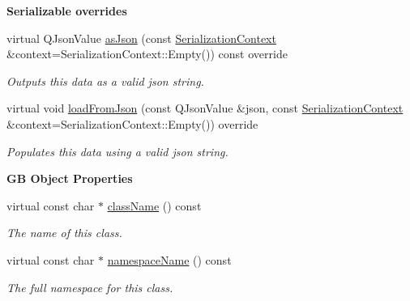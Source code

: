 \begin{Indent}\textbf{ Serializable overrides}\par
\begin{DoxyCompactItemize}
\item 
\mbox{\label{classrev_1_1_animation_state_a7ae957bef5074c327a6a705aa59ed3f7}} 
virtual Q\+Json\+Value \mbox{\hyperlink{classrev_1_1_animation_state_a7ae957bef5074c327a6a705aa59ed3f7}{as\+Json}} (const \mbox{\hyperlink{structrev_1_1_serialization_context}{Serialization\+Context}} \&context=Serialization\+Context\+::\+Empty()) const override
\begin{DoxyCompactList}\small\item\em Outputs this data as a valid json string. \end{DoxyCompactList}\item 
\mbox{\label{classrev_1_1_animation_state_a39caf170734be10eee5bab2839481997}} 
virtual void \mbox{\hyperlink{classrev_1_1_animation_state_a39caf170734be10eee5bab2839481997}{load\+From\+Json}} (const Q\+Json\+Value \&json, const \mbox{\hyperlink{structrev_1_1_serialization_context}{Serialization\+Context}} \&context=Serialization\+Context\+::\+Empty()) override
\begin{DoxyCompactList}\small\item\em Populates this data using a valid json string. \end{DoxyCompactList}\end{DoxyCompactItemize}
\end{Indent}
\begin{Indent}\textbf{ GB Object Properties}\par
\begin{DoxyCompactItemize}
\item 
virtual const char $\ast$ \mbox{\hyperlink{classrev_1_1_animation_state_a4d204d9ea91c34e1a546421dcc80f0e5}{class\+Name}} () const
\begin{DoxyCompactList}\small\item\em The name of this class. \end{DoxyCompactList}\item 
virtual const char $\ast$ \mbox{\hyperlink{classrev_1_1_animation_state_abaccd2a331d4b77be5942e5e907be3dc}{namespace\+Name}} () const
\begin{DoxyCompactList}\small\item\em The full namespace for this class. \end{DoxyCompactList}\end{DoxyCompactItemize}
\end{Indent}
